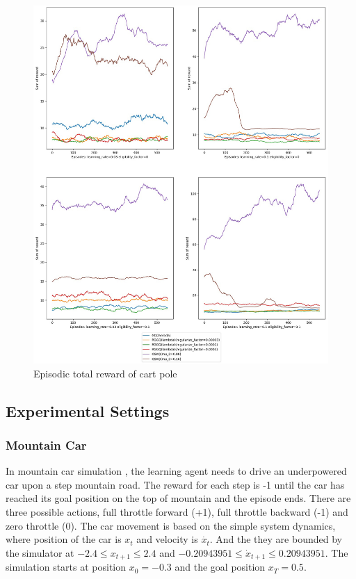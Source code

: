 \documentclass[conference]{IEEEtran}
\begin{document}
\begin{figure}[ht]
  \centering
  \includegraphics[scale=0.2]{TotalRewardCartPole.jpg}
  \caption{Episodic total reward of cart pole}
  \label{fig3}
\end{figure}
\subsection{Experimental Settings}
\subsubsection{Mountain Car}
In mountain car simulation \cite{sutton1998reinforcement}, the learning agent needs to drive an underpowered car upon a step mountain road. The reward for each step is -1 until the car has reached its goal position on the top of mountain and the episode ends. There are three possible actions, full throttle forward (+1), full throttle backward (-1) and zero throttle (0). The car movement is based on the simple system dynamics, where position of the car is $x_t$ and velocity is $\dot{x_t}$. And the they are bounded by the simulator at $-2.4 \leq x_{t+1} \leq 2.4$ and $-0.20943951 \leq \dot{x}_{t+1} \leq 0.20943951$. The simulation starts at position $x_0=-0.3$ and the goal position $x_T=0.5$.\\
\end{document}
